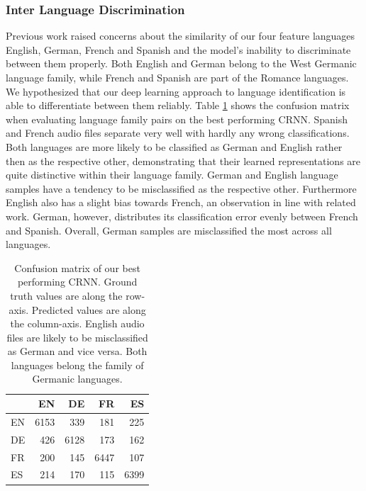 \subsubsection{Inter Language Discrimination} 
\label{sec:lang_discrimination}

Previous work\cite{montavon2009deep} raised concerns about the similarity of our four feature languages \textendash{} English, German, French and Spanish \textendash{} and the model's inability to discriminate between them properly. Both English and German belong to the West Germanic language family, while French and Spanish are part of the Romance languages. We hypothesized that our deep learning approach to language identification is able to differentiate between them reliably. 
Table \ref{tab:language_family_crnn} shows the confusion matrix when evaluating language family pairs on the best performing CRNN. Spanish and French audio files separate very well with hardly any wrong classifications. Both languages are more likely to be classified as German and English rather then as the respective other, demonstrating that their learned representations are quite distinctive within their language family. 
German and English language samples have a tendency to be misclassified as the respective other. Furthermore English also has a slight bias towards French, an observation in line with related work\cite{werkmeister2016practical}. German, however, distributes its classification error evenly between French and Spanish. Overall, German samples are misclassified the most across all languages.


	
	\begin{table}[]
	\centering
	\begin{tabularx}{\textwidth}{l|rrrr}
	      & EN     & DE     & FR     & ES \\ \midrule
    EN  & \cellcolor{lightgray} 6153   & 339    & 181    & 225 \\
    DE  & 426    & \cellcolor{lightgray} 6128   & 173    & 162 \\
    FR  & 200    & 145    &  \cellcolor{lightgray} 6447   & 107 \\
    ES  & 214    & 170    & 115    & \cellcolor{lightgray} 6399 \\
	\end{tabularx}
	\caption{Confusion matrix of our best performing CRNN. Ground truth values are along the row-axis. Predicted values are along the column-axis. English audio files are likely to be misclassified as German and vice versa. Both languages belong the family of Germanic languages. }
	\label{tab:language_family_crnn}
	\end{table}

